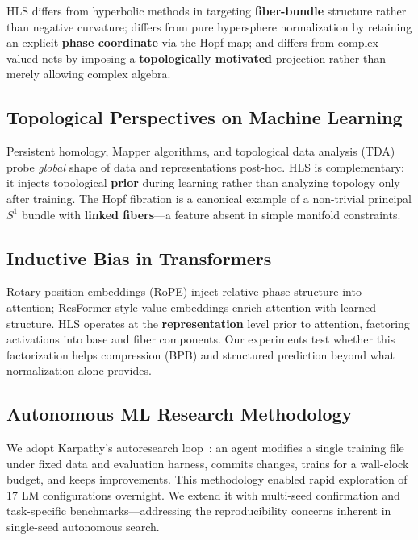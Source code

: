 \documentclass[11pt,twocolumn]{article}
\begin{document}
HLS differs from hyperbolic methods in targeting \textbf{fiber-bundle} structure rather than negative curvature; differs from pure hypersphere normalization by retaining an explicit \textbf{phase coordinate} via the Hopf map; and differs from complex-valued nets by imposing a \textbf{topologically motivated} projection rather than merely allowing complex algebra.

\subsection{Topological Perspectives on Machine Learning}

Persistent homology, Mapper algorithms, and topological data analysis (TDA) probe \emph{global} shape of data and representations post-hoc. HLS is complementary: it injects topological \textbf{prior} during learning rather than analyzing topology only after training. The Hopf fibration is a canonical example of a non-trivial principal $S^1$ bundle with \textbf{linked fibers}---a feature absent in simple manifold constraints.

\subsection{Inductive Bias in Transformers}

Rotary position embeddings (RoPE) inject relative phase structure into attention; ResFormer-style value embeddings enrich attention with learned structure. HLS operates at the \textbf{representation} level prior to attention, factoring activations into base and fiber components. Our experiments test whether this factorization helps compression (BPB) and structured prediction beyond what normalization alone provides.

\subsection{Autonomous ML Research Methodology}

We adopt Karpathy's autoresearch loop~\cite{karpathy2026}: an agent modifies a single training file under fixed data and evaluation harness, commits changes, trains for a wall-clock budget, and keeps improvements. This methodology enabled rapid exploration of 17 LM configurations overnight. We extend it with multi-seed confirmation and task-specific benchmarks---addressing the reproducibility concerns inherent in single-seed autonomous search.

\end{document}
